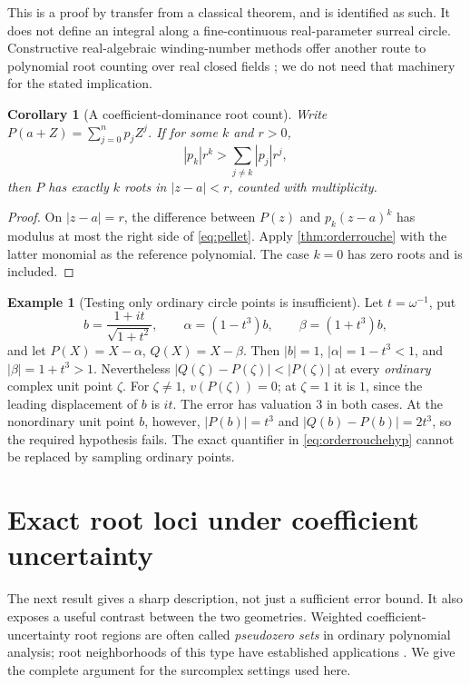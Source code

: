 \documentclass[11pt,letterpaper]{article}
\numberwithin{equation}{section}
\newtheorem{corollary}[corollary]{Corollary}
\theoremstyle{definition}
\newtheorem{example}[example]{Example}
\theoremstyle{remark}
\begin{document}
This is a proof by transfer from a classical theorem, and is identified as
such. It does not define an integral along a fine-continuous real-parameter
surreal circle. Constructive real-algebraic winding-number methods offer
another route to polynomial root counting over real closed fields
\cite{Eisermann}; we do not need that machinery for the stated implication.

\begin{corollary}[A coefficient-dominance root count]\label{cor:pellet}
Write $P(a+Z)=\sum_{j=0}^n p_jZ^j$. If for some $k$ and $r>0$,
\begin{equation}\label{eq:pellet}
 |p_k|r^k>\sum_{j\ne k}|p_j|r^j,
\end{equation}
then $P$ has exactly $k$ roots in $|z-a|<r$, counted with multiplicity.
\end{corollary}
\begin{proof}
On $|z-a|=r$, the difference between $P(z)$ and $p_k(z-a)^k$ has modulus
at most the right side of \eqref{eq:pellet}. Apply
\cref{thm:orderrouche} with the latter monomial as the reference polynomial.
The case $k=0$ has zero roots and is included.
\end{proof}

\begin{example}[Testing only ordinary circle points is insufficient]\label{ex:circlewarning}
Let $t=\omega^{-1}$, put
\[
 b=\frac{1+it}{\sqrt{1+t^2}},\qquad
 \alpha=(1-t^3)b,\qquad \beta=(1+t^3)b,
\]
and let $P(X)=X-\alpha$, $Q(X)=X-\beta$. Then $|b|=1$,
$|\alpha|=1-t^3<1$, and $|\beta|=1+t^3>1$. Nevertheless
$|Q(\zeta)-P(\zeta)|<|P(\zeta)|$ at every \emph{ordinary} complex unit
point $\zeta$. For $\zeta\ne1$, $v(P(\zeta))=0$; at $\zeta=1$ it is $1$,
since the leading displacement of $b$ is $it$. The error has valuation
$3$ in both cases. At the nonordinary unit point $b$, however,
$|P(b)|=t^3$ and $|Q(b)-P(b)|=2t^3$, so the required hypothesis fails.
The exact quantifier in \eqref{eq:orderrouchehyp} cannot be replaced by
sampling ordinary points.
\end{example}

\section{Exact root loci under coefficient uncertainty}\label{sec:pseudozeros}
The next result gives a sharp description, not just a sufficient error
bound. It also exposes a useful contrast between the two geometries.
Weighted coefficient-uncertainty root regions are often called
\emph{pseudozero sets} in ordinary polynomial analysis; root neighborhoods
of this type have established applications \cite{FaroukiHan}. We give the
complete argument for the surcomplex settings used here.
\end{document}
